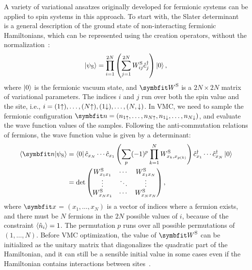A variety of variational ansatzes originally developed for fermionic systems can be applied to spin systems in this approach. To start with, the Slater determinant~\cite{slater1929theory} is a general description of the ground state of non-interacting fermionic Hamiltonians, which can be represented using the creation operators, without the normalization~\cite{toulouse2007optimization}:
\begin{equation}
\ket{\psi_\text{S}} = \prod_{i = 1}^{2 N} \left( \sum_{j = 1}^{2 N} W^\text{S}_{i j} \hat{c}^\dagger_j \right) \ket{0},
\end{equation}
where $\ket{0}$ is the fermionic vacuum state, and $\mW^\text{S}$ is a $2 N \times 2 N$ matrix of variational parameters. The indices $i$ and $j$ run over both the spin value and the site, i.e., $i = (1 {\uparrow}), \ldots, (N {\uparrow}), (1 {\downarrow}), \ldots, (N, {\downarrow})$. In VMC, we need to sample the fermionic configuration $\vn = (n_{1 \spinup}, \ldots, n_{N \spinup}, n_{1 \spindown}, \ldots, n_{N \spindown})$, and evaluate the wave function values of the samples. Following the anti-commutation relations of fermions, the wave function value is given by a determinant:
\begin{align}
\ip{\vn}{\psi_\text{S}} &= \bra{0} \hat{c}_{x_N} \cdots \hat{c}_{x_1} \left( \sum_p (-1)^p \prod_{k = 1}^N W^\text{S}_{x_k, x_{p(k)}} \right) \hat{c}^\dagger_{x_1} \cdots \hat{c}^\dagger_{x_N} \ket{0} \\
&= \det \begin{pmatrix}
W^\text{S}_{x_1 x_1} & \cdots & W^\text{S}_{x_1 x_N} \\
\vdots & \ddots & \vdots \\
W^\text{S}_{x_N x_1} & \cdots & W^\text{S}_{x_N x_N}
\end{pmatrix},
\end{align}
where $\vx$ = $(x_1, \ldots, x_N)$ is a vector of indices where a fermion exists, and there must be $N$ fermions in the $2 N$ possible values of $i$, because of the constraint $\ev{\hat{n}_i} = 1$. The permutation $p$ runs over all possible permutations of $(1, \ldots, N)$. Before VMC optimization, the value of $\mW^\text{S}$ can be initialized as the unitary matrix that diagonalizes the quadratic part of the Hamiltonian, and it can still be a sensible initial value in some cases even if the Hamiltonian contains interactions between sites~\cite{yokoyama1987variational, gross1987Antiferromagnetic, ferrari2022charge}.

